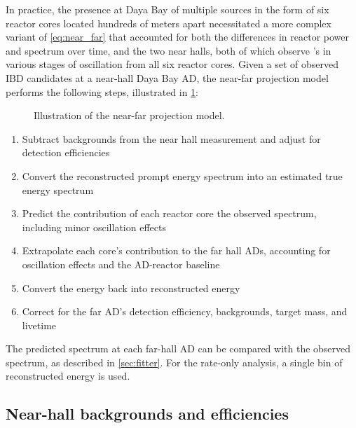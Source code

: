 In practice, the presence at Daya Bay of multiple \nuebar{} sources
in the form of six reactor cores located hundreds of meters apart
necessitated a more complex variant of \cref{eq:near_far}
that accounted for both the differences in reactor power and spectrum over time,
and the two near halls, both of which observe \nuebar{}'s
in various stages of oscillation from all six reactor cores.
Given a set of observed IBD candidates at a near-hall Daya Bay AD,
the near-far projection model performs the following steps,
illustrated in \cref{fig:near_far_cartoon}:

\begin{figure}
    \caption{Illustration of the near-far projection model.}
    \label{fig:near_far_cartoon}
\end{figure}

\begin{enumerate}
    \item Subtract backgrounds from the near hall measurement
        and adjust for detection efficiencies
    \item Convert the reconstructed prompt energy spectrum
        into an estimated true \nuebar{} energy spectrum
    \item Predict the contribution of each reactor core
        the observed \nuebar{} spectrum,
        including minor oscillation effects
    \item Extrapolate each core's contribution to the far hall ADs,
        accounting for oscillation effects and the AD-reactor baseline
    \item Convert the \nuebar{} energy back into reconstructed energy
    \item Correct for the far AD's detection efficiency, backgrounds,
        target mass, and livetime
\end{enumerate}
The predicted spectrum at each far-hall AD can be compared
with the observed spectrum, as described in \cref{sec:fitter}.
For the rate-only analysis, a single bin of reconstructed energy is used.

\subsection{Near-hall backgrounds and efficiencies}
\label{subsec:near_bg_eff}

